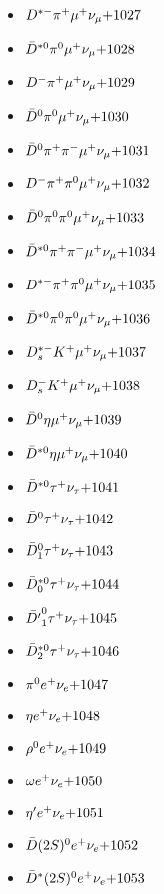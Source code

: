 \begin{multicols}{3}
\begin{itemize}
 \item $ D^{*-} \pi^{+} \mu^{+} \nu_{\mu} \hfill{+1027}$
 \item $ \bar{D}^{*0} \pi^{0} \mu^{+} \nu_{\mu} \hfill{+1028}$
 \item $ D^{-} \pi^{+} \mu^{+} \nu_{\mu} \hfill{+1029}$
 \item $ \bar{D}^{0} \pi^{0} \mu^{+} \nu_{\mu} \hfill{+1030}$
 \item $ \bar{D}^{0} \pi^{+} \pi^{-} \mu^{+} \nu_{\mu} \hfill{+1031}$
 \item $ D^{-} \pi^{+} \pi^{0} \mu^{+} \nu_{\mu} \hfill{+1032}$
 \item $ \bar{D}^{0} \pi^{0} \pi^{0} \mu^{+} \nu_{\mu} \hfill{+1033}$
 \item $ \bar{D}^{*0} \pi^{+} \pi^{-} \mu^{+} \nu_{\mu} \hfill{+1034}$
 \item $ D^{*-} \pi^{+} \pi^{0} \mu^{+} \nu_{\mu} \hfill{+1035}$
 \item $ \bar{D}^{*0} \pi^{0} \pi^{0} \mu^{+} \nu_{\mu} \hfill{+1036}$
 \item $ D_{s}^{*-} K^{+} \mu^{+} \nu_{\mu} \hfill{+1037}$
 \item $ D_{s}^{-} K^{+} \mu^{+} \nu_{\mu} \hfill{+1038}$
 \item $ \bar{D}^{0} \eta \mu^{+} \nu_{\mu} \hfill{+1039}$
 \item $ \bar{D}^{*0} \eta \mu^{+} \nu_{\mu} \hfill{+1040}$
 \item $ \bar{D}^{*0} \tau^{+} \nu_{\tau} \hfill{+1041}$
 \item $ \bar{D}^{0} \tau^{+} \nu_{\tau} \hfill{+1042}$
 \item $ \bar{D}_{1}^{0} \tau^{+} \nu_{\tau} \hfill{+1043}$
 \item $ \bar{D}_{0}^{*0} \tau^{+} \nu_{\tau} \hfill{+1044}$
 \item $ \bar{{D^{\prime}}}_{1}^{0} \tau^{+} \nu_{\tau} \hfill{+1045}$
 \item $ \bar{D}_{2}^{*0} \tau^{+} \nu_{\tau} \hfill{+1046}$
 \item $ \pi^{0} e^{+} \nu_{e} \hfill{+1047}$
 \item $ \eta e^{+} \nu_{e} \hfill{+1048}$
 \item $ \rho^{0} e^{+} \nu_{e} \hfill{+1049}$
 \item $ \omega e^{+} \nu_{e} \hfill{+1050}$
 \item $ {\eta^{\prime}} e^{+} \nu_{e} \hfill{+1051}$
 \item $ \bar{D}(2S)^{0} e^{+} \nu_{e} \hfill{+1052}$
 \item $ \bar{D}^{*}(2S)^{0} e^{+} \nu_{e} \hfill{+1053}$

\end{itemize}
\end{multicols}

